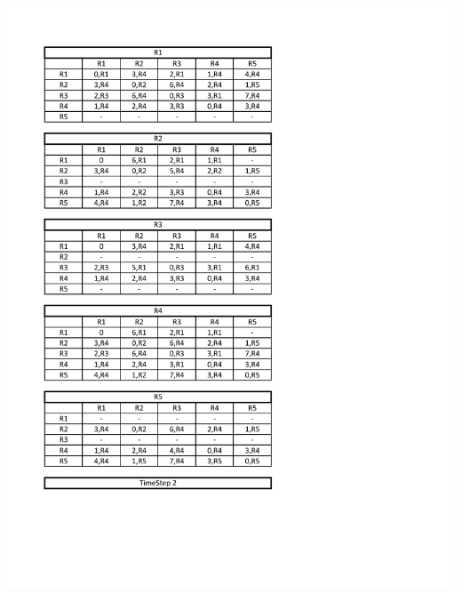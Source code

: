 \documentclass[12pt]{article}
\begin{document}
 \begin{center}
	\includegraphics[width = 1.0 \textwidth]{images/3.pdf}
\end{center}
\end{document}

